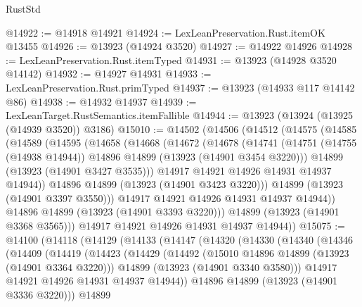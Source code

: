 \begin{lexlean}{RustStd}
\begin{coremodule}
@14922 := @14918 @14921
@14924 := LexLeanPreservation.Rust.itemOK @13455
@14926 := @13923 (@14924 @3520)
@14927 := @14922 @14926
@14928 := LexLeanPreservation.Rust.itemTyped
@14931 := @13923 (@14928 @3520 @14142)
@14932 := @14927 @14931
@14933 := LexLeanPreservation.Rust.primTyped
@14937 := @13923 (@14933 @117 @14142 @86)
@14938 := @14932 @14937
@14939 := LexLeanTarget.RustSemantics.itemFallible
@14944 := @13923 (@13924 (@13925 (@14939 @3520)) @3186)
@15010 := @14502
    (@14506
      (@14512
        (@14575
          (@14585
            (@14589
              (@14595
                (@14658
                  (@14668
                    (@14672
                      (@14678
                        (@14741
                          (@14751
                            (@14755 (@14938 @14944))
                            @14896
                            @14899
                            (@13923 (@14901 @3454 @3220)))
                          @14899
                          (@13923 (@14901 @3427 @3535)))
                        @14917
                        @14921
                        @14926
                        @14931
                        @14937
                        @14944))
                    @14896
                    @14899
                    (@13923 (@14901 @3423 @3220)))
                  @14899
                  (@13923 (@14901 @3397 @3550)))
                @14917
                @14921
                @14926
                @14931
                @14937
                @14944))
            @14896
            @14899
            (@13923 (@14901 @3393 @3220)))
          @14899
          (@13923 (@14901 @3368 @3565)))
        @14917
        @14921
        @14926
        @14931
        @14937
        @14944))
@15075 := @14100
    (@14118
      (@14129
        (@14133
          (@14147
            (@14320
              (@14330
                (@14340
                  (@14346
                    (@14409
                      (@14419
                        (@14423
                          (@14429
                            (@14492
                              (@15010 @14896 @14899 (@13923 (@14901 @3364 @3220)))
                              @14899
                              (@13923 (@14901 @3340 @3580)))
                            @14917
                            @14921
                            @14926
                            @14931
                            @14937
                            @14944))
                        @14896
                        @14899
                        (@13923 (@14901 @3336 @3220)))
                      @14899

\end{coremodule}
\end{lexlean}
